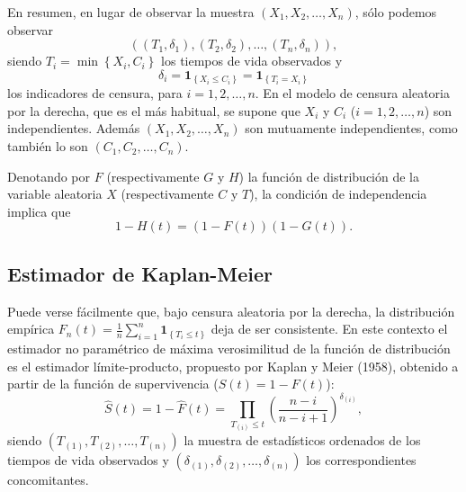 \documentclass[
]{book}
\theoremstyle{break}
\theoremstyle{definition}
\theoremstyle{definition}
\theoremstyle{definition}
\theoremstyle{remark}
\begin{document}
En resumen, en lugar de observar la muestra
\(\left( X_1, X_2, \ldots, X_n \right)\), sólo podemos observar
\[\left( \left( T_1, \delta _1 \right), \left( T_2, \delta _2 \right),
\ldots ,\left( T_n, \delta_n \right) \right),\]
siendo \(T_i=\min \left\{ X_i,C_i\right\}\)
los tiempos de vida observados y
\[\delta _i=\mathbf{1}_{\left\{ X_i\leq
C_i\right\} }=\mathbf{1}_{\left\{ T_i=X_i\right\} }\]
los indicadores de censura, para \(i=1,2,\ldots ,n\).
En el modelo de censura aleatoria por la derecha,
que es el más habitual, se supone que \(X_i\)
y \(C_i\) (\(i=1,2,\ldots ,n\)) son independientes.
Además \(\left( X_1, X_2, \ldots ,X_n \right)\) son mutuamente independientes,
como también lo son \(\left( C_1, C_2,\ldots ,C_n \right)\).

Denotando por \(F\) (respectivamente \(G\) y \(H\)) la función de distribución
de la variable aleatoria \(X\) (respectivamente \(C\) y \(T\)), la condición
de independencia implica que
\[1-H\left( t \right) =\left( 1-F\left(
t \right) \right) \left( 1-G\left( t \right) \right).\]

\hypertarget{estimador-de-kaplan-meier}{%
\subsection{Estimador de Kaplan-Meier}\label{estimador-de-kaplan-meier}}

Puede verse fácilmente que, bajo censura aleatoria por la derecha, la
distribución empírica \(F_n\left( t \right) =\frac{1}{n} \sum_{i=1}^{n}\mathbf{1}_{\left\{ T_i\leq t\right\} }\) deja de ser
consistente. En este contexto el estimador no paramétrico de máxima
verosimilitud de la función de distribución es el estimador
límite-producto, propuesto por Kaplan y Meier (1958), obtenido
a partir de la función de supervivencia
(\(S\left( t \right) = 1-F\left( t \right)\)):
\[\hat{S}\left( t \right) = 1-\hat{F}\left( t \right) =
\prod_{T_{(i)}\leq t}\left( \frac{n-i}{n-i+1} \right)^{\delta _{(i)}},\]
siendo \(\left( T_{(1)},T_{\left( 2 \right)},\ldots ,T_{\left( n \right)} \right)\) la muestra de estadísticos ordenados de los tiempos
de vida observados y \(\left( \delta _{(1)},\delta _{\left(2 \right)}, \ldots ,\delta _{(n)} \right)\) los correspondientes concomitantes.
\end{document}

